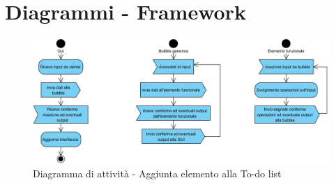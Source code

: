 \section{Diagrammi - Framework}

\begin{figure}[H]
	\centering
	\includegraphics[width=14cm]{diagrammi_img/attivita/framework.png}
	\caption{Diagramma di attività - Aggiunta elemento alla To-do list}
\end{figure}